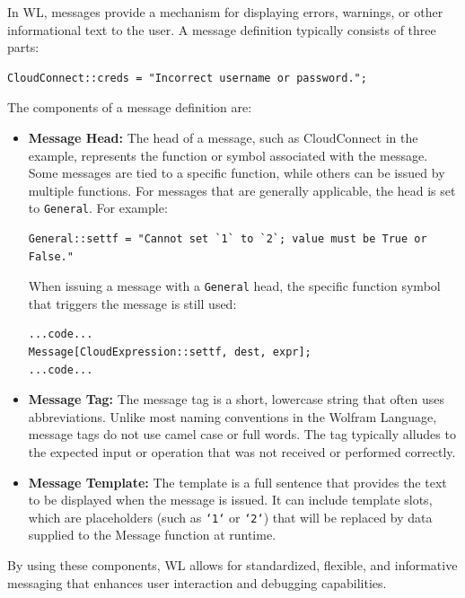 In WL, messages provide a mechanism for displaying errors, warnings, or other informational text to the user. A message definition typically consists of three parts:

\begin{verbatim}
CloudConnect::creds = "Incorrect username or password.";
\end{verbatim}

The components of a message definition are:

\begin{itemize}
    \item \textbf{Message Head:} The head of a message, such as CloudConnect in the example, represents the function or symbol associated with the message. Some messages are tied to a specific function, while others can be issued by multiple functions. For messages that are generally applicable, the head is set to \texttt{General}. For example:

\begin{verbatim}
General::settf = "Cannot set `1` to `2`; value must be True or False."
\end{verbatim}

    When issuing a message with a \texttt{General} head, the specific function symbol that triggers the message is still used:

\begin{verbatim}
...code...
Message[CloudExpression::settf, dest, expr];
...code...
\end{verbatim}

    \item \textbf{Message Tag:} The message tag is a short, lowercase string that often uses abbreviations. Unlike most naming conventions in the Wolfram Language, message tags do not use camel case or full words. The tag typically alludes to the expected input or operation that was not received or performed correctly.

    \item \textbf{Message Template:} The template is a full sentence that provides the text to be displayed when the message is issued. It can include template slots, which are placeholders (such as \texttt{`1`} or \texttt{`2`}) that will be replaced by data supplied to the Message function at runtime.
\end{itemize}

By using these components, WL allows for standardized, flexible, and informative messaging that enhances user interaction and debugging capabilities.


